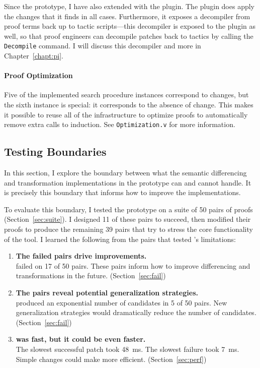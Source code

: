 Since the \sysname prototype, I have also extended \sysnamelong with the \toolnamec plugin.
The \toolnamec plugin does apply the changes that it finds in all cases.
Furthermore, it exposes a decompiler from proof terms back up to tactic scripts---this
decompiler is exposed to the \sysname plugin as well, so that proof engineers can decompile patches
back to tactics by calling the \lstinline{Decompile} command.
I will discuss this decompiler and more in Chapter~\ref{chapt:pi}.

\paragraph{Proof Optimization}
Five of the implemented search procedure instances correspond to changes, but the sixth instance is special:
it corresponds to the absence of change.
This makes it possible to reuse all of the \sysname infrastructure to optimize proofs
to automatically remove extra calls to induction.
See \lstinline{Optimization.v} for more information.

\subsection{Testing Boundaries}
\label{sec:bound-eval}

In this section, I explore the boundary between what the semantic differencing
and transformation implementations in the \sysname prototype can and cannot handle.
It is precisely this boundary that informs how to improve the implementations.

To evaluate this boundary, I tested the \sysname prototype on a suite of 50 pairs of proofs (Section~\ref{sec:suite}).
I designed 11 of these pairs to succeed, then modified their proofs to produce the remaining 39 pairs
that try to stress the core functionality of the tool.
I learned the following from the pairs
that tested \sysname's limitations:

\begin{enumerate}
\item \textbf{The failed pairs drive improvements.} \\
\sysname failed on 17 of 50 pairs. These pairs inform how to improve differencing and transformations in the future. (Section~\ref{sec:fail})
\item \textbf{The pairs reveal potential generalization strategies.} \\
\sysname produced an exponential number of candidates in 5 of 50 pairs.
New generalization strategies would dramatically reduce the number of candidates. (Section~\ref{sec:fail})
\item {} \textbf{was fast, but it could be even faster.} \\
The slowest successful patch took \SI{48}{\ms}. The slowest failure took \SI{7}{\ms}.
Simple changes could make \sysname more efficient. (Section~\ref{sec:perf})
\end{enumerate}

